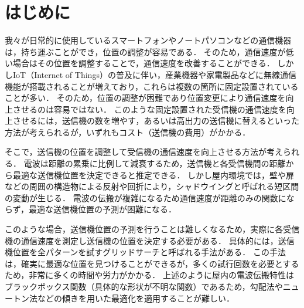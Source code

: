 \documentclass[twocolumn]{ltjarticle}
\begin{document}



\section{はじめに}
我々が日常的に使用しているスマートフォンやノートパソコンなどの通信機器は，持ち運ぶことができ，位置の調整が容易である．
そのため，通信速度が低い場合はその位置を調整することで，通信速度を改善することができる．
しかしIoT（Internet of Things）の普及に伴い，産業機器や家電製品などに無線通信機能が搭載されることが増えており，これらは複数の箇所に固定設置されていることが多い\cite{soumu}．
そのため，位置の調整が困難であり位置変更により通信速度を向上させるのは容易ではない．
このような固定設置された受信機の通信速度を向上させるには，送信機の数を増やす，あるいは高出力の送信機に替えるといった方法が考えられるが，いずれもコスト（送信機の費用）がかかる．

そこで，送信機の位置を調整して受信機の通信速度を向上させる方法が考えられる．
電波は距離の累乗に比例して減衰するため，送信機と各受信機間の距離から最適な送信機位置を決定できると推定できる．
しかし屋内環境では，壁や扉などの周囲の構造物による反射や回折により，シャドウイングと呼ばれる短区間の変動が生じる．
電波の伝搬が複雑になるため通信速度が距離のみの関数にならず，最適な送信機位置の予測が困難になる．

このような場合，送信機位置の予測を行うことは難しくなるため，実際に各受信機の通信速度を測定し送信機の位置を決定する必要がある．
具体的には，送信機位置を全パターンを試すグリッドサーチと呼ばれる手法がある．
この手法は，確実に最適な位置を見つけることができるが，多くの試行回数を必要とするため，非常に多くの時間や労力がかかる．
上述のように屋内の電波伝搬特性はブラックボックス関数（具体的な形状が不明な関数）であるため，勾配法やニュートン法などの傾きを用いた最適化を適用することが難しい．
\end{document}
